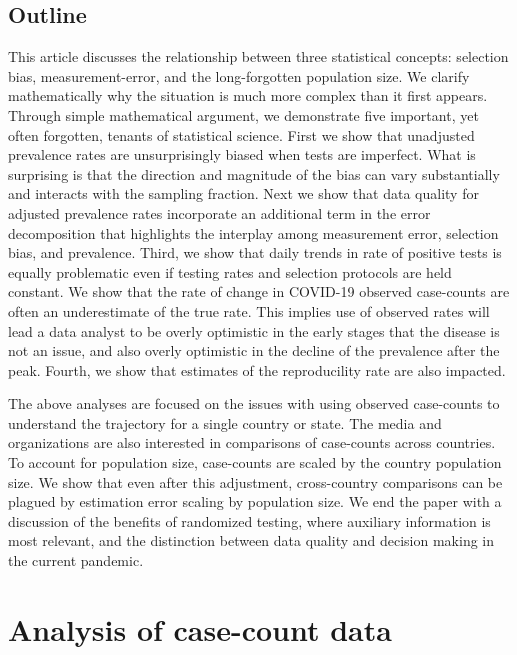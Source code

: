 \documentclass[11pt]{amsart}
\begin{document}
\subsection{Outline}

This article discusses the relationship between three statistical concepts: selection bias, measurement-error, and the long-forgotten population size. We clarify mathematically why the situation is much more complex than it first appears.  Through simple mathematical argument, we demonstrate five important, yet often forgotten, tenants of statistical science.  First we show that unadjusted prevalence rates are unsurprisingly biased when tests are imperfect. What is surprising is that the direction and magnitude of the bias can vary substantially and interacts with the sampling fraction.  Next we show that data quality for adjusted prevalence rates incorporate an additional term in the error decomposition that highlights the interplay among measurement error, selection bias, and prevalence.  Third, we show that daily trends in rate of positive tests is equally problematic even if testing rates and selection protocols are held constant.  We show that the rate of change in COVID-19 observed case-counts are often an underestimate of the true rate. This implies use of observed rates will lead a data analyst to be overly optimistic in the early stages that the disease is not an issue, and also overly optimistic in the decline of the prevalence after the peak.   Fourth, we show that estimates of the reproducility rate are also impacted.

The above analyses are focused on the issues with using observed case-counts to understand the trajectory for a single country or state.  The media and organizations are also interested in comparisons of case-counts across countries. To account for population size, case-counts are scaled by the country population size.  We show that even after this adjustment, cross-country comparisons can be plagued by estimation error scaling by population size.  We end the paper with a discussion of the benefits of randomized testing, where auxiliary information is most relevant, and the distinction between data quality and decision making in the current pandemic.

\section{Analysis of case-count data}
\end{document}
